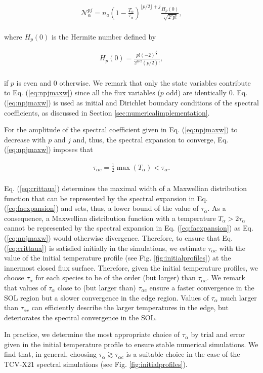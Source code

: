 \documentclass[preprint,12pt]{elsarticle}
\newcommand{\N}{\mathcal{N}_{\alpha}}
\renewcommand{\a}{\alpha}
\begin{document}
\begin{align} \label{eq:npjmaxw}
\N^{pj} = n_a \left( 1 - \frac{T_\a}{\tau_\a}\right)^{\lfloor p/2 \rfloor + j} \frac{H_p(0)}{\sqrt{2^p p!}},
\end{align}
\\
where $H_p(0)$ is the Hermite number defined by \cite{gradshteyn2014}

\begin{align}
H_p(0) =  \frac{p! (-2)^{\frac{p}{2}}}{2^{p/ 2}  (p/2)! } ,
\end{align}
\\
if $p$ is even and $0$ otherwise. We remark that only the state variables contribute to Eq. (\ref{eq:npjmaxw}) since all the flux variables ($p$ odd) are identically $0$. Eq. (\ref{eq:npjmaxw}) is used as initial and Dirichlet boundary conditions of the spectral coefficients, as discussed in Section \ref{sec:numericalimplementation}. 

For the amplitude of the spectral coefficient given in Eq. (\ref{eq:npjmaxw}) to decrease with $p$ and $j$ and, thus, the spectral expansion to converge, Eq. (\ref{eq:npjmaxw}) imposes that

\begin{align} \label{eq:crittaua}
\tau_{\a c} = \frac{1}{2}\max \left(T_\a\right) <  \tau_\a.
\end{align}
\\
Eq. (\ref{eq:crittaua}) determines the maximal width of a Maxwellian distribution function that can be represented by the spectral expansion in Eq. (\ref{eq:faexpansion}) and sets, thus, a lower bound of the value of $\tau_\alpha$. As a consequence, a Maxwellian distribution function with a temperature $T_\alpha > 2 \tau_\alpha$ cannot be represented by the spectral expansion in Eq. (\ref{eq:faexpansion}) as Eq. (\ref{eq:npjmaxw}) would otherwise divergence. Therefore, to ensure that Eq. (\ref{eq:crittaua}) is satisfied initially in the simulations, we estimate $\tau_{\a c}$ with the value of the initial temperature profile (see Fig. \ref{fig:initialprofiles}) at the innermost closed flux surface. Therefore, given the initial temperature profiles, we choose $\tau_\a$ for each species to be of the order (but larger) than $\tau_{\a c}$. We remark that values of $\tau_\a$ close to (but larger than) $\tau_{\a c}$ ensure a faster convergence in the SOL region but a slower convergence in the edge region. Values of $\tau_\a$ much larger than $\tau_{\a c}$ can efficiently describe the larger temperatures in the edge, but deteriorates the spectral convergence in the SOL. 

In practice, we determine the most appropriate choice of $\tau_\a$ by trial and error given in the initial temperature profile to ensure stable numerical simulations. We find that, in general, choosing $\tau_\a \gtrsim \tau_{\a c}$ is a suitable choice in the case of the TCV-X21 spectral simulations (see Fig. \ref{fig:initialprofiles}).

 

\end{document}
